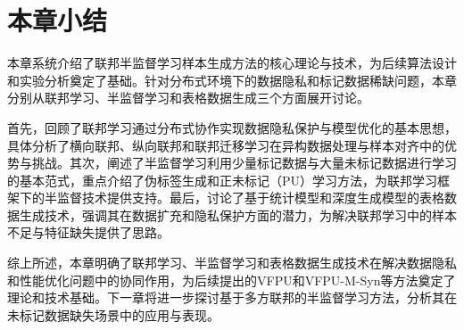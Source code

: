 \section{本章小结}
本章系统介绍了联邦半监督学习样本生成方法的核心理论与技术，为后续算法设计和实验分析奠定了基础。针对分布式环境下的数据隐私和标记数据稀缺问题，本章分别从联邦学习、半监督学习和表格数据生成三个方面展开讨论。

首先，回顾了联邦学习通过分布式协作实现数据隐私保护与模型优化的基本思想，具体分析了横向联邦、纵向联邦和联邦迁移学习在异构数据处理与样本对齐中的优势与挑战。其次，阐述了半监督学习利用少量标记数据与大量未标记数据进行学习的基本范式，重点介绍了伪标签生成和正未标记（PU）学习方法，为联邦学习框架下的半监督技术提供支持。最后，讨论了基于统计模型和深度生成模型的表格数据生成技术，强调其在数据扩充和隐私保护方面的潜力，为解决联邦学习中的样本不足与特征缺失提供了思路。

综上所述，本章明确了联邦学习、半监督学习和表格数据生成技术在解决数据隐私和性能优化问题中的协同作用，为后续提出的VFPU和VFPU-M-Syn等方法奠定了理论和技术基础。下一章将进一步探讨基于多方联邦的半监督学习方法，分析其在未标记数据缺失场景中的应用与表现。
